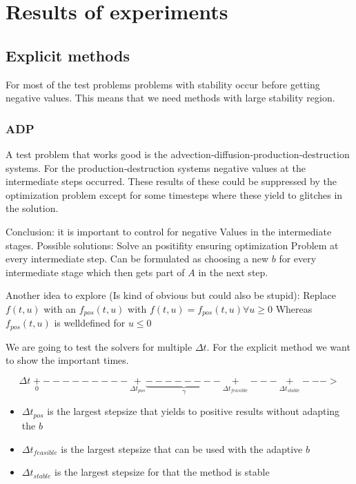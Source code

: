 \documentclass{article}
\begin{document}
\section{Results of experiments}
\subsection{Explicit methods}
For most of the test problems problems with stability occur before getting negative values. This means that we need methods with large stability region.

\subsubsection{ADP}
A test problem that works good is the advection‐diffusion‐production‐destruction systems. 
For the production‐destruction systems negative values at the intermediate steps occurred. These results of these could be suppressed by the optimization problem  except for some timesteps where these yield to glitches in the solution.

Conclusion: it is important to control for negative Values in the intermediate stages.
Possible solutions: Solve an positifity ensuring optimization Problem at every intermediate step.
Can be formulated as choosing a new $b$ for every intermediate stage which then gets part of $A$ in the next step.

Another idea to explore (Is kind of obvious but could also be stupid): Replace $f(t,u)$ with an $f_{pos}(t,u)$ with 
$f(t,u)=f_{pos}(t,u) \forall u \geq 0 $
Whereas $f_{pos}(t,u)$ is welldefined for $u \leq 0$


We are going to test the solvers for multiple $\Delta t$. For the explicit method we want to show the important times.

$$ \Delta t \; \underset{0}{+}---------\underset{\Delta t_{pos}}{+}\underbrace{--------}_{\gamma}\underset{\Delta t_{feasible}}{+}---\underset{\Delta t_{stable}}{+}--->  $$

\begin{itemize}
\item
$\Delta t_{pos}$ is the largest stepsize that yields to positive results without adapting the $b$

\item
$\Delta t_{feasible}$ is the largest stepsize that can be used with the adaptive $b$

\item
$\Delta t_{stable}$ is the largest stepsize for that the method is stable
\end{itemize}
\end{document}
